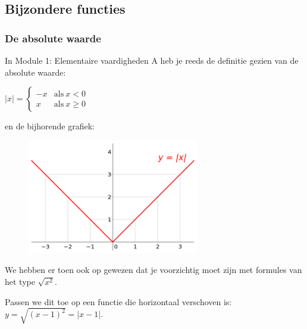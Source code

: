 


\subsection{Bijzondere functies}

\subsubsection{De absolute waarde}

\noindent In Module 1: Elementaire vaardigheden A heb je reeds de
definitie gezien van de absolute waarde:

${\displaystyle \left|x\right|=\begin{cases}
-x & \textrm{als}\:x<0\\
x & \textrm{als}\:x\geq0
\end{cases}}$

\medskip{}


\noindent en de bijhorende grafiek:

\noindent 
\begin{figure}[h]
\centering{}\includegraphics[height=5cm]{2_elem_rekenvaardigheden_B/inputs/Absolute_value_svg} 
\end{figure}


\noindent We hebben er toen ook op gewezen dat je voorzichtig moet
zijn met formules van het type $\sqrt{x^{2}}$.

\noindent Passen we dit toe op een functie die horizontaal verschoven
is: ${\displaystyle y=\sqrt{(x-1)^{2}}=\left|x-1\right|}$.

